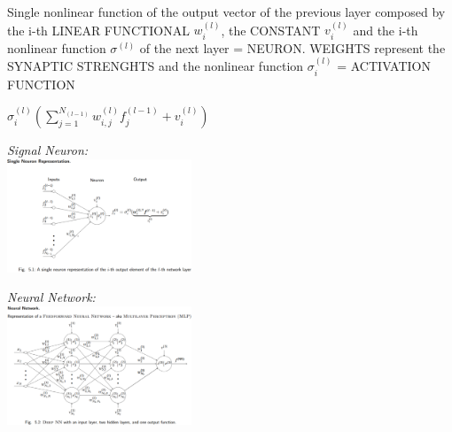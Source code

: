 \begin{sectionbox}
Single nonlinear function of the output vector of the previous layer composed by the i-th LINEAR FUNCTIONAL $w_i^{(l)}$, the CONSTANT $v_i^{(l)}$ and the i-th nonlinear function $\sigma^{(l)}$ of the next layer = NEURON. WEIGHTS represent the SYNAPTIC STRENGHTS and the nonlinear function $\sigma_i^{(l)}$ = ACTIVATION FUNCTION\\
\begin{emphbox}
$\sigma_i^{(l)}(\sum_{j=1}^{N_{(l-1)}}w_{i,j}^{(l)}f_j^{(l-1)}+v_i^{(l)})$

\end{emphbox}

\parbox{5.5cm}{\emph{Signal Neuron:} \\ \includegraphics[width = 5.5cm]{./img/signalneuronrep}}

\parbox{5.5cm}{\emph{Neural Network:} \\ \includegraphics[width = 5.5cm]{./img/neuralnetwork}}
\end{sectionbox}
